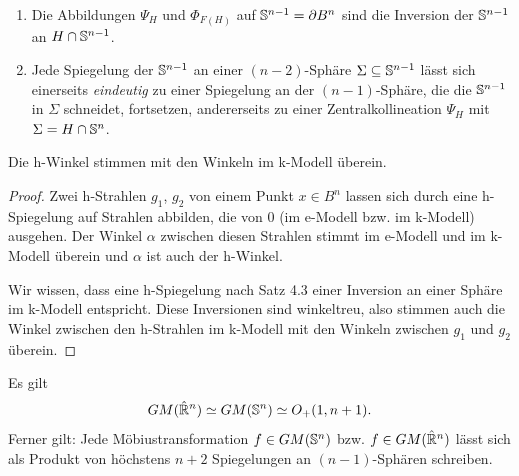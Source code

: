 \begin{rmrk*}
 \begin{enumerate}[1)]
  \item Die Abbildungen $\Psi_H$ und $\Phi_{F(H)}$ auf $\mathbb{S}^{n-1} = \partial B^n$ sind die Inversion der $\mathbb{S}^{n-1}$ an $H \cap \mathbb{S}^{n-1}$.
  \item Jede Spiegelung der $\mathbb{S}^{n-1}$ an einer $(n-2)$-Sphäre $\Sigma \subseteq \mathbb{S}^{n-1}$ lässt sich einerseits \emph{ein\-deu\-tig} zu einer Spiegelung an der $(n-1)$-Sphäre, die die $\mathbb{S}^{n-1}$ in $\Sigma$ schneidet, fortsetzen, andererseits zu einer Zentralkollineation $\Psi_H$ mit $\Sigma = H \cap \mathbb{S}^n$.
 \end{enumerate}
\end{rmrk*}

\begin{thm}
 Die h-Winkel stimmen mit den Winkeln im k-Modell überein.
\end{thm}

\begin{proof}
 Zwei h-Strahlen $g_1$, $g_2$ von einem Punkt $x \in B^n$ lassen sich durch eine h-Spiegelung auf Strahlen abbilden, die von 0 (im e-Modell bzw. im k-Modell) ausgehen. Der Winkel $\alpha$ zwischen diesen Strahlen stimmt im e-Modell und im k-Modell überein und $\alpha$ ist auch der h-Winkel.
 
 Wir wissen, dass eine h-Spiegelung nach Satz 4.3 einer Inversion an einer Sphäre im k-Modell entspricht. Diese Inversionen sind winkeltreu, also stimmen auch die Winkel zwischen den h-Strahlen im k-Modell mit den Winkeln zwischen $g_1$ und $g_2$ überein.
\end{proof}

\begin{thm}
 Es gilt 
 \[ GM(\hat{\mathbb{R}}^n) \simeq GM( \mathbb{S}^n ) \simeq O_+ (1, n+1). \]
 Ferner gilt: Jede Möbiustransformation $f \in GM(\mathbb{S}^n)$ bzw. $f \in GM(\hat{\mathbb{R}}^n)$ lässt sich als Produkt von höchstens $n+2$ Spiegelungen an $(n-1)$-Sphären schreiben.
\end{thm}

